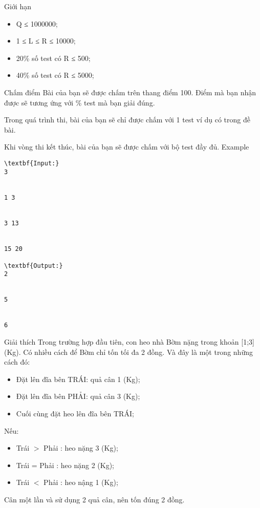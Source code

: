 Giới hạn
\begin{itemize}
	\item     Q ≤ 1000000;   
	\item     1 ≤ L ≤ R ≤ 10000;   
	\item     20\% số test có R ≤ 500;   
	\item     40\% số test có R ≤ 5000;   
\end{itemize}
Chấm điểm
Bài của bạn sẽ được chấm trên thang điểm 100. Điểm mà bạn nhận được sẽ tương ứng với \% test mà bạn giải đúng.  

   Trong quá trình thi, bài của bạn sẽ chỉ được chấm với 1 test ví dụ có trong đề bài.  

   Khi vòng thi kết thúc, bài của bạn sẽ được chấm với bộ test đầy đủ.
Example
\begin{verbatim}
\textbf{Input:}
3


1 3


3 13


15 20

\textbf{Output:}
2


5


6\end{verbatim}
Giải thích
Trong trường hợp đầu tiên, con heo nhà Bờm nặng trong khoản [1;3] (Kg). Có nhiều cách để Bờm chỉ tốn tối đa 2 đồng. Và đây là một trong những cách đó:  
\begin{itemize}
	\item     Đặt lên đĩa bên TRÁI: quả cân 1 (Kg);   
	\item     Đặt lên đĩa bên PHẢI: quả cân 3 (Kg);   
	\item     Cuối cùng đặt heo lên đĩa bên TRÁI;   
\end{itemize}

   Nếu:  
\begin{itemize}
	\item     Trái $>$ Phải : heo nặng 3 (Kg);   
	\item     Trái = Phải : heo nặng 2 (Kg);   
	\item     Trái $<$ Phải : heo nậng 1 (Kg);   
\end{itemize}
\begin{itemize}
\end{itemize}

   Cân một lần và sử dụng 2 quả cân, nên tốn đúng 2 đồng.